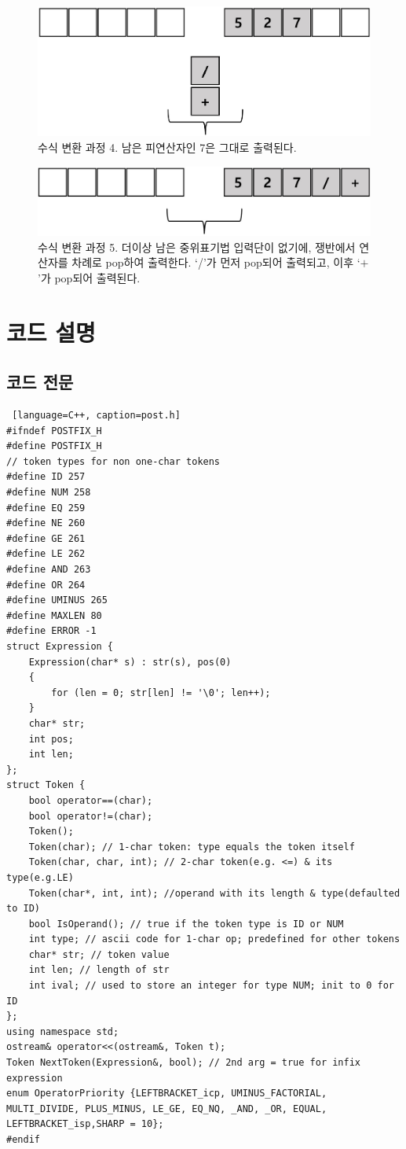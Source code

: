 \documentclass{article}
\begin{document}
\begin{figure}[ht!]
    \centering
    \includegraphics[width = \textwidth]{postfix_process_4.jpg}
    \caption[수식 변환 과정 4]{수식 변환 과정 4. 남은 피연산자인 7은 그대로 출력된다.}
    \label{fig:postfixProcess4}
\end{figure}
\begin{figure}[ht!]
    \centering
    \includegraphics[width = \textwidth]{postfix_process_5.jpg}
    \caption[수식 변환 과정 5]{수식 변환 과정 5. 더이상 남은 중위표기법 입력단이 없기에, 쟁반에서 연산자를 차례로 pop하여 출력한다. `/'가 먼저 pop되어 출력되고, 이후 `$+$'가 pop되어 출력된다.}
    \label{fig:postfixProcess5}
\end{figure}
\section{코드 설명}
\subsection{코드 전문}
\begin{lstlisting} [language=C++, caption=post.h]
#ifndef POSTFIX_H
#define POSTFIX_H
// token types for non one-char tokens
#define ID 257
#define NUM 258
#define EQ 259
#define NE 260
#define GE 261
#define LE 262
#define AND 263
#define OR 264
#define UMINUS 265
#define MAXLEN 80
#define ERROR -1
struct Expression {
	Expression(char* s) : str(s), pos(0)
	{
		for (len = 0; str[len] != '\0'; len++);
	}
	char* str;
	int pos;
	int len;
};
struct Token {
	bool operator==(char);
	bool operator!=(char);
	Token();
	Token(char); // 1-char token: type equals the token itself
	Token(char, char, int); // 2-char token(e.g. <=) & its type(e.g.LE)
	Token(char*, int, int); //operand with its length & type(defaulted to ID)
	bool IsOperand(); // true if the token type is ID or NUM
	int type; // ascii code for 1-char op; predefined for other tokens
	char* str; // token value
	int len; // length of str
	int ival; // used to store an integer for type NUM; init to 0 for ID
};
using namespace std;
ostream& operator<<(ostream&, Token t);
Token NextToken(Expression&, bool); // 2nd arg = true for infix expression
enum OperatorPriority {LEFTBRACKET_icp, UMINUS_FACTORIAL, MULTI_DIVIDE, PLUS_MINUS, LE_GE, EQ_NQ, _AND, _OR, EQUAL, LEFTBRACKET_isp,SHARP = 10};
#endif
\end{lstlisting}
\end{document}
